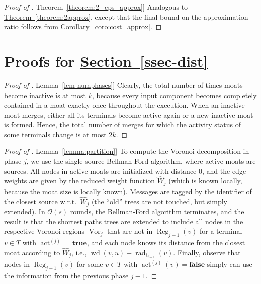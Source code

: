\documentclass[letterpaper,11pt]{article}
\newcommand{\namedref}[2]{\hyperref[#2]{#1~\ref*{#2}}}
\newcommand{\sectionref}[1]{\namedref{Section}{#1}}
\newcommand{\theoremref}[1]{\namedref{Theorem}{#1}}
\newcommand{\lemmaref}[1]{\namedref{Lemma}{#1}}
\newcommand{\corollaryref}[1]{\namedref{Corollary}{#1}}
\newcommand{\BO}{\mathcal{O}}
\DeclareMathOperator{\act}{act}
\DeclareMathOperator{\moat}{rad}
\DeclareMathOperator{\Wd}{wd}
\DeclareMathOperator{\reg}{Reg}
\DeclareMathOperator{\vor}{Vor}
\newcommand{\true}{\mathbf{true}}
\newcommand{\false}{\mathbf{false}}
\begin{document}
\begin{proof}[Proof of \theoremref{theorem:2+eps_approx}]
Analogous to \theoremref{theorem:2approx}, except that the final bound on the
approximation ratio follows from \corollaryref{coro:cost_approx}.
\end{proof}

\section{\texorpdfstring{Proofs for \sectionref{ssec-dist}}{Proofs Concerning
the Distributed Moat Growing Algorithm}}
\label{app-dist}


\begin{proof}[Proof of \lemmaref{lem-numphases}]
  Clearly, the total number of times moats become inactive is at
  most $k$, because every input component becomes completely contained in a moat
  exactly once throughout the execution. When  an inactive moat
  merges, either all its 
  terminals become active again or a new inactive moat is formed. Hence, the
  total number of merges for which the activity status of some terminals change
  is at most $2k$.
\end{proof}

\begin{proof}[Proof of \lemmaref{lemma:partition}]
To compute the Voronoi decomposition in phase $j$, we use the single-source
Bellman-Ford algorithm, where active moats are sources.
All nodes in active moats are initialized with distance $0$, and the edge
weights are given by the reduced weight function $\hat{W}_j$ (which is known
locally, because the moat size is locally known). Messages are tagged by the
identifier of the closest source w.r.t.\ $\hat{W}_j$ (the ``old'' trees are not
touched, but simply extended). In $\BO(s)$ rounds, the Bellman-Ford algorithm
terminates, and the result is that the shortest paths trees are extended to
include all nodes in the respective Voronoi regions $\vor_j$ that are not in
$\reg_{j-1}(v)$ for a terminal $v\in T$ with $\act^{(j)}=\true$, and each node
knows its distance from the closest moat according to $\hat W_j$, i.e.,
$\Wd(v,u)-\moat_{i_{j-1}}(v)$. Finally, observe that nodes in $\reg_{j-1}(v)$
for some $v\in T$ with $\act^{(j)}(v)=\false$ simply can use the information
from the previous phase $j-1$.
\end{proof}
\end{document}
